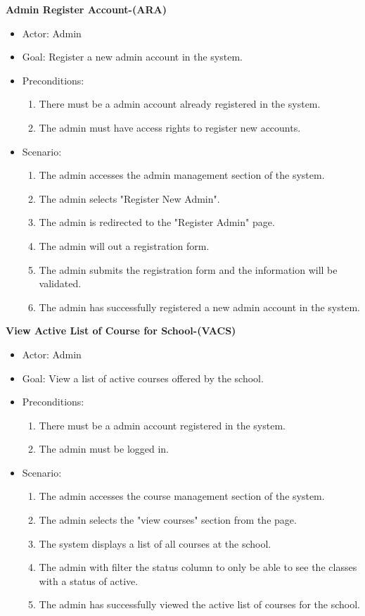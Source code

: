 \documentclass[letterpaper,12pt,oneside,listof=totoc]{scrreprt}
\begin{document}
\hfill \break
\textbf{Admin Register Account-(ARA)}
\begin{itemize}
    \item Actor: Admin
    \item Goal: Register a new admin account in the system.
    \item Preconditions:
    \begin{enumerate}
        \item There must be a admin account already registered in the system.
        \item The admin must have access rights to register new accounts.
    \end{enumerate}
    \item Scenario:
    \begin{enumerate}
        \item The admin accesses the admin management section of the system.
        \item The admin selects "Register New Admin".
        \item The admin is redirected to the "Register Admin" page.
        \item The admin will out a registration form.
        \item  The admin submits the registration form and the information will be validated.
        \item The admin has successfully registered a new admin account in the system.
    \end{enumerate}
\end{itemize}

\hfill \break
\textbf{View Active List of Course for School-(VACS)}
\begin{itemize}
    \item Actor: Admin
    \item Goal: View a list of active courses offered by the school.
    \item Preconditions:
    \begin{enumerate}
        \item There must be a admin account registered in the system.
        \item The admin must be logged in.
    \end{enumerate}
    \item Scenario:
    \begin{enumerate}
        \item The admin accesses the course management section of the system.
        \item The admin selects the "view courses" section from the page. 
        \item The system displays a list of all courses at the school.
        \item The admin with filter the status column to only be able to see the classes with a status of active.
        \item The admin has successfully viewed the active list of courses for the school.
    \end{enumerate}
\end{itemize}
\end{document}
